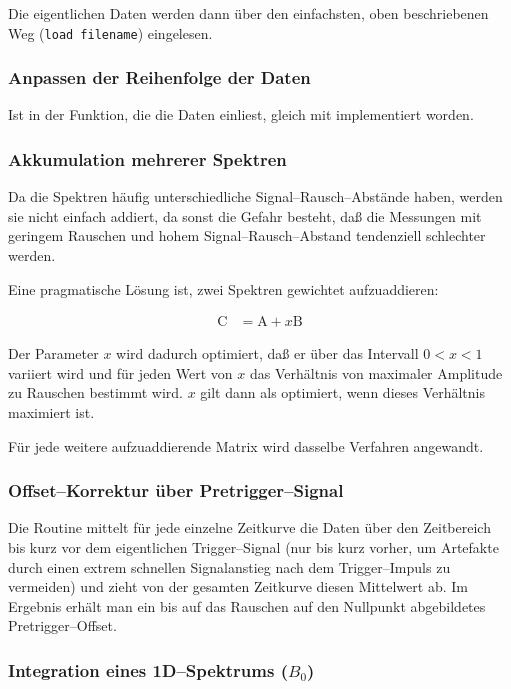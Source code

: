 \documentclass{article}
\newcommand{\vect}[1]{\boldsymbol{\mathrm #1}}
\newcommand{\cmd}[1]{\texttt{#1}}
\begin{document}
Die eigentlichen Daten werden dann über den einfachsten, oben beschriebenen Weg 
(\cmd{load filename}) eingelesen.


\subsubsection{Anpassen der Reihenfolge der Daten}

Ist in der Funktion, die die Daten einliest, gleich mit implementiert worden.


\subsubsection{Akkumulation mehrerer Spektren}

Da die Spektren häufig unterschiedliche Signal--Rausch--Abstände haben, werden 
sie nicht einfach addiert, da sonst die Gefahr besteht, daß die Messungen mit 
geringem Rauschen und hohem Signal--Rausch--Abstand tendenziell schlechter 
werden.

Eine pragmatische Lösung ist, zwei Spektren gewichtet aufzuaddieren:

\begin{align*}
	\vect{C} &= \vect{A} + x \vect{B}
\end{align*}

Der Parameter $x$ wird dadurch optimiert, daß er über das Intervall $0 < x < 1$ 
variiert wird und für jeden Wert von $x$ das Verhältnis von maximaler Amplitude 
zu Rauschen bestimmt wird. $x$ gilt dann als optimiert, wenn dieses Verhältnis 
maximiert ist.

Für jede weitere aufzuaddierende Matrix wird dasselbe Verfahren angewandt.


\subsubsection{Offset--Korrektur über Pretrigger--Signal}

Die Routine mittelt für jede einzelne Zeitkurve die Daten über den Zeitbereich 
bis kurz vor dem eigentlichen Trigger--Signal (nur bis kurz vorher, um 
Artefakte durch einen extrem schnellen Signalanstieg nach dem Trigger--Impuls 
zu vermeiden) und zieht von der gesamten Zeitkurve diesen Mittelwert ab. Im 
Ergebnis erhält man ein bis auf das Rauschen auf den Nullpunkt abgebildetes 
Pretrigger--Offset.


\subsubsection{Integration eines 1D--Spektrums ($B_0$)}
\end{document}
